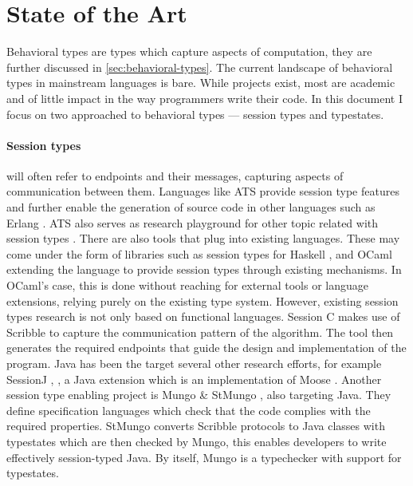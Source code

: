 \section{State of the Art}\label{sec:state-of-the-art}

Behavioral types are types which capture aspects of computation, they are further discussed in \autoref{sec:behavioral-types}.
The current landscape of behavioral types in mainstream languages is bare.
While projects exist, most are academic and of little impact in the way programmers write their code.
In this document I focus on two approached to behavioral types --- session types and typestates.

\paragraph{Session types} will often refer to endpoints and their messages, capturing aspects of communication between them.
Languages like ATS provide session type features and further enable the generation of source code in other languages
such as Erlang \autocite{Xi2016}. ATS also serves as research playground for other topic related with session types \autocite{Xi2016a}.
There are also tools that plug into existing languages.
These may come under the form of libraries such as session types
for Haskell \autocite[Section 3.3]{Ancona2016}, \autocite[Chapter 10]{Gay2017} and OCaml \autocite[Chapter 11]{Gay2017}
extending the language to provide session types through existing mechanisms.
In OCaml's case, this is done without reaching for external tools or language extensions,
relying purely on the existing type system.
However, existing session types research is not only based on functional languages.
Session C \autocite[Section 4.1]{Ancona2016} makes use of Scribble \autocite{Yoshida2014} to capture the communication pattern of the algorithm.
The tool then generates the required endpoints that guide the design and implementation of the program.
Java has been the target several other research efforts, for example SessionJ \autocite[Section 2.2.1]{Ancona2016}, \autocite{Hu2008},
a Java extension which is an implementation of Moose \autocite[Section 2.1.1]{Ancona2016}.
Another session type enabling project is Mungo \& StMungo \autocite{Kouzapas2018, Voinea2020}, also targeting Java.
They define specification languages which check that the code complies with the required properties.
StMungo converts Scribble protocols to Java classes with typestates which are then checked by Mungo,
this enables developers to write effectively session-typed Java.
By itself, Mungo is a typechecker with support for typestates.


